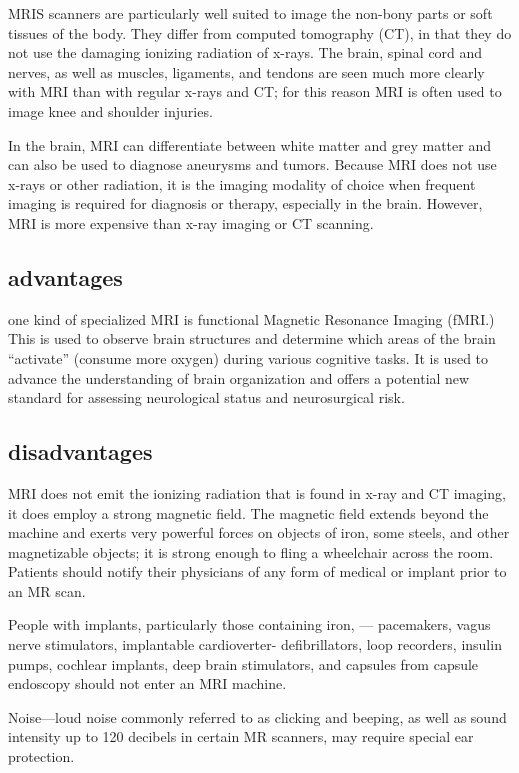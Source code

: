 \documentclass{article}
\begin{document}
MRIS scanners are particularly well suited to image the non-bony parts or soft tissues of the body. They differ from computed tomography (CT), in that they do not use the damaging ionizing radiation of x-rays. The brain, spinal cord and nerves, as well as muscles, ligaments, and tendons are seen much more clearly with MRI than with regular x-rays and CT; for this reason MRI is often used to image knee and shoulder injuries.

In the brain, MRI can differentiate between white matter and grey matter and can also be used to diagnose aneurysms and tumors. Because MRI does not use x-rays or other radiation, it is the imaging modality of choice when frequent imaging is required for diagnosis or therapy, especially in the brain. However, MRI is more expensive than x-ray imaging or CT scanning.
\clearpage

\subsection{advantages}
one kind of specialized MRI is functional Magnetic Resonance Imaging (fMRI.) This is used to observe brain structures and determine which areas of the brain “activate” (consume more oxygen) during various cognitive tasks. It is used to advance the understanding of brain organization and offers a potential new standard for assessing neurological status and neurosurgical risk.



\subsection{disadvantages}
MRI does not emit the ionizing radiation that is found in x-ray and CT imaging, it does employ a strong magnetic field. The magnetic field extends beyond the machine and exerts very powerful forces on objects of iron, some steels, and other magnetizable objects; it is strong enough to fling a wheelchair across the room. Patients should notify their physicians of any form of medical or implant prior to an MR scan.

People with implants, particularly those containing iron, — pacemakers, vagus nerve stimulators, implantable cardioverter- defibrillators, loop recorders, insulin pumps, cochlear implants, deep brain stimulators, and capsules from capsule endoscopy should not enter an MRI machine.


Noise—loud noise commonly referred to as clicking and beeping, as well as sound intensity up to 120 decibels in certain MR scanners, may require special ear protection.
\end{document}
